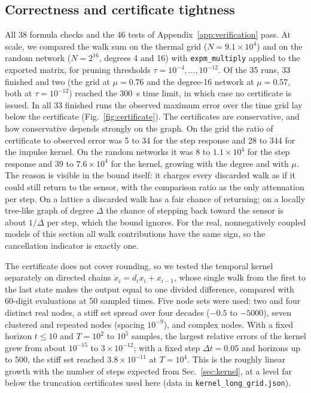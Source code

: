\documentclass[aps,pra,superscriptaddress,floatfix,longbibliography,twocolumn]{revtex4-2}
\begin{document}
\subsection{Correctness and certificate tightness}\label{sec:accuracy}
All 38 formula checks and the 46 tests of Appendix~\ref{app:verification} pass. At scale, we compared the walk sum on the thermal grid ($N=9.1\times10^4$) and on the random network ($N=2^{16}$, degrees 4 and 16) with \texttt{expm\_multiply} applied to the exported matrix, for pruning thresholds $\tau=10^{-4},\dots,10^{-12}$. Of the 35 runs, 33 finished and two (the grid at $\mu=0.76$ and the degree-16 network at $\mu=0.57$, both at $\tau=10^{-12}$) reached the 300~s time limit, in which case no certificate is issued. In all 33 finished runs the observed maximum error over the time grid lay below the certificate (Fig.~\ref{fig:certificate}). The certificates are conservative, and how conservative depends strongly on the graph. On the grid the ratio of certificate to observed error was 5 to 34 for the step response and 28 to 344 for the impulse kernel. On the random networks it was 8 to $1.1\times10^4$ for the step response and 39 to $7.6\times10^4$ for the kernel, growing with the degree and with $\mu$. The reason is visible in the bound itself: it charges every discarded walk as if it could still return to the sensor, with the comparison ratio as the only attenuation per step. On a lattice a discarded walk has a fair chance of returning; on a locally tree-like graph of degree $\Delta$ the chance of stepping back toward the sensor is about $1/\Delta$ per step, which the bound ignores. For the real, nonnegatively coupled models of this section all walk contributions have the same sign, so the cancellation indicator is exactly one.

The certificate does not cover rounding, so we tested the temporal kernel separately on directed chains $\dot x_i=d_ix_i+x_{i-1}$, whose single walk from the first to the last state makes the output equal to one divided difference, compared with 60-digit evaluations at 50 sampled times. Five node sets were used: two and four distinct real nodes, a stiff set spread over four decades ($-0.5$ to $-5000$), seven clustered and repeated nodes (spacing $10^{-9}$), and complex nodes. With a fixed horizon $t\le10$ and $T=10^2$ to $10^5$ samples, the largest relative errors of the kernel grew from about $10^{-15}$ to $3\times10^{-12}$; with a fixed step $\Delta t=0.05$ and horizons up to 500, the stiff set reached $3.8\times10^{-11}$ at $T=10^4$. This is the roughly linear growth with the number of steps expected from Sec.~\ref{sec:kernel}, at a level far below the truncation certificates used here (data in \texttt{kernel\_long\_grid.json}).
\end{document}
